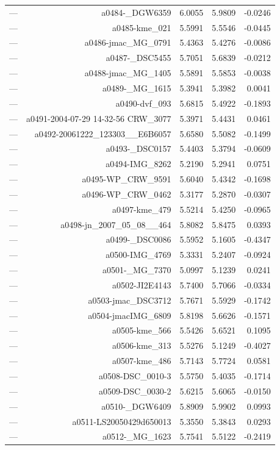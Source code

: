 \begin{table}[htbp]
\begin{tabular}{lrrrr}
— & a0484-_DGW6359 & 6.0055 & 5.9809 & -0.0246 \\
— & a0485-kme_021 & 5.5991 & 5.5546 & -0.0445 \\
— & a0486-jmac_MG_0791 & 5.4363 & 5.4276 & -0.0086 \\
— & a0487-_DSC5455 & 5.7051 & 5.6839 & -0.0212 \\
— & a0488-jmac_MG_1405 & 5.5891 & 5.5853 & -0.0038 \\
— & a0489-_MG_1615 & 5.3941 & 5.3982 & 0.0041 \\
— & a0490-dvf_093 & 5.6815 & 5.4922 & -0.1893 \\
— & a0491-2004-07-29 14-32-56 CRW_3077 & 5.3971 & 5.4431 & 0.0461 \\
— & a0492-20061222_123303__E6B6057 & 5.6580 & 5.5082 & -0.1499 \\
— & a0493-_DSC0157 & 5.4403 & 5.3794 & -0.0609 \\
— & a0494-IMG_8262 & 5.2190 & 5.2941 & 0.0751 \\
— & a0495-WP_CRW_9591 & 5.6040 & 5.4342 & -0.1698 \\
— & a0496-WP_CRW_0462 & 5.3177 & 5.2870 & -0.0307 \\
— & a0497-kme_479 & 5.5214 & 5.4250 & -0.0965 \\
— & a0498-jn_2007_05_08__464 & 5.8082 & 5.8475 & 0.0393 \\
— & a0499-_DSC0086 & 5.5952 & 5.1605 & -0.4347 \\
— & a0500-IMG_4769 & 5.3331 & 5.2407 & -0.0924 \\
— & a0501-_MG_7370 & 5.0997 & 5.1239 & 0.0241 \\
— & a0502-JI2E4143 & 5.7400 & 5.7066 & -0.0334 \\
— & a0503-jmac_DSC3712 & 5.7671 & 5.5929 & -0.1742 \\
— & a0504-jmacIMG_6809 & 5.8198 & 5.6626 & -0.1571 \\
— & a0505-kme_566 & 5.5426 & 5.6521 & 0.1095 \\
— & a0506-kme_313 & 5.5276 & 5.1249 & -0.4027 \\
— & a0507-kme_486 & 5.7143 & 5.7724 & 0.0581 \\
— & a0508-DSC_0010-3 & 5.5750 & 5.4035 & -0.1714 \\
— & a0509-DSC_0030-2 & 5.6215 & 5.6065 & -0.0150 \\
— & a0510-_DGW6409 & 5.8909 & 5.9902 & 0.0993 \\
— & a0511-LS20050429d650013 & 5.3550 & 5.3843 & 0.0293 \\
— & a0512-_MG_1623 & 5.7541 & 5.5122 & -0.2419 \\

\end{tabular}
\end{table}
